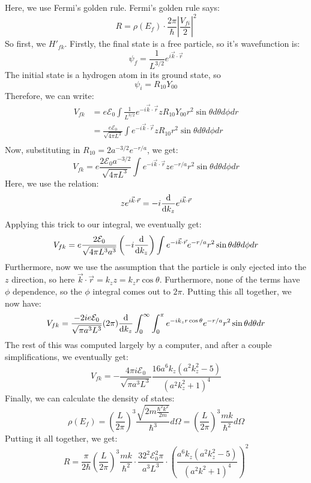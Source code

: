 \documentclass[10pt]{article}
\begin{document}
	\begin{solution}
		Here, we use Fermi's golden rule. Fermi's golden rule says:
		\[
			R = \rho(E_f) \cdot \frac{2\pi}{\hbar}\left|\frac{V_{fi}}{2}\right|^2
		\] 
		So first, we $H'_{fk}$. Firstly, the final state is a free particle, so it's wavefunction is: 
		\[
			\psi_f = \frac{1}{L^{3/2}} e^{i\vec k \cdot \vec r}
		\] 
		The initial state is a hydrogen atom in its ground state, so
		\[
			\psi_i = R_{10} Y_{00} 
		\] 
		Therefore, we can write:
		\begin{align*}
			V_{fk} &= e\mathcal E_0\int \frac{1}{L^{3/2}}e^{-i \vec k \cdot \vec r} z R_{10}Y_{00}
			r^2 \sin \theta d \theta d\phi dr\\
					&= \frac{e\mathcal E_0}{\sqrt{4\pi L^3} } \int e^{-i \vec k \cdot \vec r}
					z R_{10} r^2 \sin \theta d\theta d\phi dr\\
		\end{align*}
		Now, substituting in $R_{10} = 2a^{-3/2} e^{-r/a}$, we get:
		\[
			V_{fk} = e\frac{2\mathcal E_0 a^{-3/2}}{\sqrt{4\pi L^3}} \int e^{-i \vec k \cdot
			\vec r} z e^{-r/a} r^2 \sin \theta d \theta d\phi dr
		\] 
		Here, we use the relation:
		\[
			ze^{i \vec k \cdot \vec r} = -i \dv{k_z} e^{i\vec k \cdot \vec r}
		\] 
		Applying this trick to our integral, we eventually get:
		\[
			V_{fk} =e \frac{2\mathcal E_0}{ \sqrt{4\pi L^3 a^3} } 
			\left(-i \dv{k_z}\right)\int e^{-i \vec k \cdot \vec r} e^{-r/a} r^2 \sin \theta d\theta d\phi dr\\
		\]
		Furthermore, now we use the assumption that the particle is only ejected into the $z$ direction, so 
		here $\vec k \cdot \vec r = k_z z = k_z r \cos \theta$. Furthermore, none of the terms have $\phi$ 
		dependence, so the $\phi$ integral comes out to $2\pi$. Putting this all together, we now have:
		\[
			V_{fk} = \frac{-2 ie \mathcal E_0}{\sqrt{\pi a^3 L^3} }(2\pi)\dv{k_z} \int_0^\infty \int_0^\pi
			e^{-ik_z r \cos \theta} e^{-r/a} r^2 \sin \theta d\theta dr 
		\] 
		The rest of this was computed largely by a computer, and after a couple simplifications, we eventually 
		get:
		\[ V_{fk} = -\frac{4\pi i\mathcal E_0}{\sqrt{\pi a^3L^3}} \frac{16 a^6 k_z (a^2 k_z^2 - 5)}{(a^2 k_z^2 + 1)^4}\]
		Finally, we can calculate the density of states:
		\[ \rho(E_f) = \left( \frac{L}{2\pi}\right)^3 \frac{\sqrt{2m \frac{\hbar^2 k^2}{2m}}}{\hbar^3} d\Omega = \left( \frac{L}{2\pi}\right)^3\frac{mk}{\hbar^2} d\Omega \]
		Putting it all together, we get:
		\[ R = \frac{\pi}{2\hbar} \left( \frac{L}{2\pi}\right)^3\frac{mk}{\hbar^2} \cdot \frac{32^2 \mathcal E_0^2 \pi}{a^3 L^3} \cdot \left( \frac{a^6 k_z (a^2 k_z^2 - 5)}{(a^2 k^2 + 1)^4}\right)^2\]
		

	\end{solution}
\end{document}
